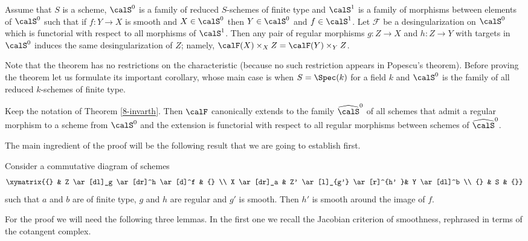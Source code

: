 \documentclass[10pt]{../fichiers-configuration-latex/smfart}
\begin{document}
\begin{theorem2}\label{8-invarth} Assume that $S$ is a scheme,
$\calS^0$ is a family of reduced $S$-schemes of finite type and
$\calS^1$ is a family of morphisms between elements of $\calS^0$
such that if $f{\colon}Y\to X$ is smooth and $X\in\calS^0$
then $Y\in\calS^0$ and $f\in\calS^1$. Let $\mathscr{F}$
be a desingularization on $\calS^0$ which is functorial with
respect to all morphisms of $\calS^1$. Then any pair of regular
morphisms $g{\colon}Z\to X$ and $h{\colon}Z\to Y$ with targets
in $\calS^0$ induces the same desingularization of $Z$; namely,
$\calF(X)\times_XZ=\calF(Y)\times_YZ$.  \end{theorem2}

Note that the theorem has no restrictions on the characteristic
(because no such restriction appears in Popescu's theorem). Before
proving the theorem let us formulate its important corollary,
whose main case is when $S=\Spec(k)$ for a field $k$ and $\calS^0$
is the family of all reduced $k$-schemes of finite type.

\begin{corollary2}\label{8-invarcor} Keep the notation of Theorem
\ref{8-invarth}. Then $\calF$ canonically extends to the family
$\widehat{\calS}^0$ of all schemes that admit a regular morphism to
a scheme from $\calS^0$ and the extension is functorial with respect
to all regular morphisms between schemes of $\widehat{\calS}^0$.
\end{corollary2}

The main ingredient of the proof will be the following result that
we are going to establish first.

\begin{proposition2}\label{8-invarprop} Consider a commutative
diagram of schemes $$ \xymatrix{{} & Z \ar[dl]_g \ar[dr]^h  \ar[d]^f
& {} \\ X \ar[dr]_a & Z' \ar[l]_{g'} \ar[r]^{h' }& Y \ar[dl]^b \\
{} & S & {}} $$ such that $a$ and $b$ are of finite type, $g$ and
$h$ are regular and $g'$ is smooth. Then $h'$ is smooth around the
image of $f$.  \end{proposition2}

For the proof we will need the following three lemmas. In the first
one we recall the Jacobian criterion of smoothness, rephrased in
terms of the cotangent complex.
\end{document}
